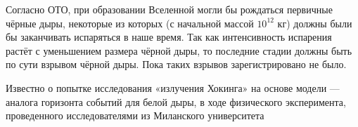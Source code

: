 \documentclass[a4paper, 12pt]{extarticle}
\begin{document}
  Согласно ОТО, при образовании Вселенной могли бы рождаться первичные чёрные дыры, некоторые из
  которых (с начальной массой $10^{12}$ кг) должны были бы заканчивать испаряться в наше время. Так как
  интенсивность испарения растёт с уменьшением размера чёрной дыры, то последние стадии должны быть
  по сути взрывом чёрной дыры. Пока таких взрывов зарегистрировано не было.

  Известно о попытке исследования «излучения Хокинга» на основе модели — аналога горизонта событий
  для белой дыры, в ходе физического эксперимента, проведенного исследователями из Миланского
  университета
\end{document}
